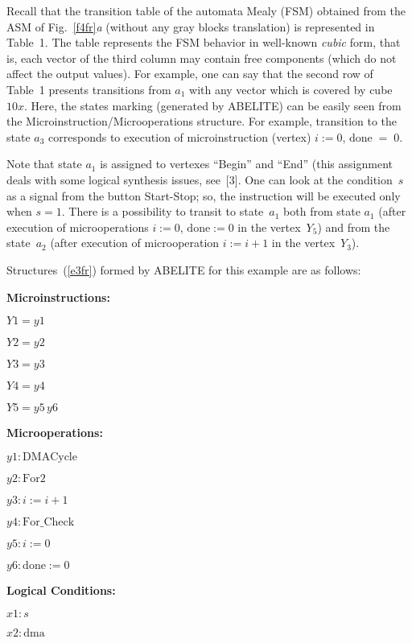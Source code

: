 \begin{multicols}{2}
       Recall that the transition table of the automata Mealy (FSM) obtained from the ASM of 
Fig.~\ref{f4fr}\textit{a} (without any gray blocks translation) is represented in 
Table~1. The table represents the FSM behavior in well-known \textit{cubic} form, that 
is, each vector of the third column may contain free components (which do not affect the output 
values). For example, one can say that the second row of Table~1 presents transitions 
from $a_1$ with any vector which is covered by cube~$10x$. Here, the states marking (generated 
by ABELITE) can be easily seen from the Microinstruction/Microoperations structure. For 
example, transition to the state $a_3$ corresponds to execution of microinstruction (vertex) 
{$i:=0$, $\mathrm{done}\;=\;0$}.

Note that state $a_1$ is assigned to vertexes ``Begin'' and ``End'' (this assignment deals with some 
logical synthesis issues, see~[3].  One can look at the condition~$s$ as a signal from the 
button Start-Stop; so, the instruction will be executed only when $s = 1$. There is a
possibility to transit to state~$a_1$ both from state $a_1$ (after execution of microoperations $i:=0$, 
$\mathrm{done}:=0$ in the vertex~$Y_5$) and from the state~$a_2$ (after execution of microoperation 
$i:=i+1$ in the vertex~$Y_3$).
   
Structures~(\ref{e3fr}) formed by ABELITE for this example are
as follows:
   
   \smallskip
   \textbf{Microinstructions:}
   \smallskip
   
   $Y1 = y1$
   
   $Y2 = y2$
   
   $Y3 = y3$
   
   $Y4 = y4$
   
   $Y5 = y5\,y6$
   
   \smallskip
   \textbf{Microoperations:}
   \smallskip
   
   $y1  :  \mbox{DMACycle}$
   
   $y2  :  \mbox{For2}$
   
   $y3  :  i:=i+1$
   
   $y4  :  \mathrm{For\_Check}$
   
   $y5  :  i:=0$
   
   $y6  :  \mathrm{done}:=0$
   
   \smallskip
   \textbf{Logical Conditions:}
   \smallskip
   
   $x1  : s$
   
   $x2  : \mathrm{dma}$
   

\end{multicols}
